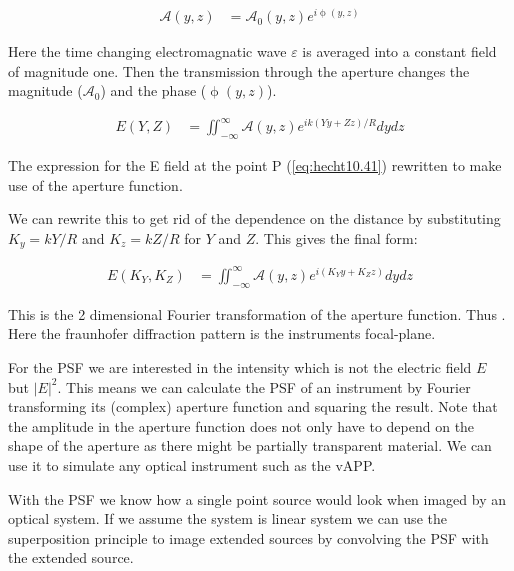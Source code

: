 \begin{align}
\mathscr{A}(y,z) &= \mathscr{A}_0 (y,z)e^{i\upphi(y,z)}\label{eq:helper}
\end{align}

Here the time changing electromagnatic wave $\varepsilon$ is averaged into a constant field of magnitude one. Then the transmission through the aperture changes the magnitude ($\mathscr{A}_0$) and the phase ($\upphi(y,z)$).

\begin{subequations}[resume]
  \begin{align}
    E(Y,Z) &= \iint_{-\infty}^{\infty} \mathscr{A}(y,z) e^{ik(Yy+Zz)/R} dydz%
    \label{eq:hecht:2}
  \end{align}
\end{subequations}

The expression for the E field at the point P (\autoref{eq:hecht10.41}) rewritten to make use of the aperture function.

We can rewrite this to get rid of the dependence on the distance by substituting $K_y = kY/R$ and $K_z = kZ/R$ for $Y$ and $Z$. This gives the final form: 

\begin{subequations}[resume]
  \begin{align}
    E(K_Y,K_Z) &= \iint_{-\infty}^{\infty} \mathscr{A}(y,z) e^{i(K_Yy+K_Zz)} dydz%
    \label{eq:hecht:3}
  \end{align}
\end{subequations}

This is the 2 dimensional Fourier transformation of the aperture function. Thus  \cite{hecht}. Here the fraunhofer diffraction pattern is the instruments focal-plane.

For the \ac{PSF} we are interested in the intensity which is not the electric field $E$ but ${|E|}^2$. This means we can calculate the \ac{PSF} of an instrument by Fourier transforming its (complex) aperture function and squaring the result. Note that the amplitude in the aperture function does not only have to depend on the shape of the aperture as there might be partially transparent material. We can use it to simulate any optical instrument such as the \acf*{vAPP}.

With the \ac{PSF} we know how a single point source would look when imaged by an optical system. If we assume the system is linear system we can use the superposition principle to image extended sources by convolving the \ac{PSF} with the extended source. 

